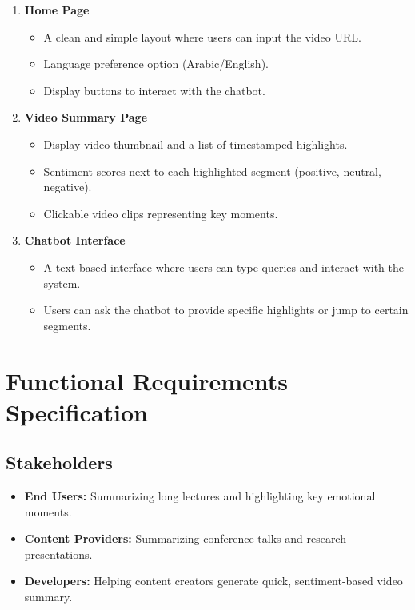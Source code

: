 \documentclass{bscs}
\begin{document}
\begin{enumerate}
    \item \textbf{Home Page}
    \begin{itemize}
        \item A clean and simple layout where users can input the video URL.
        \item Language preference option (Arabic/English).
        \item Display buttons to interact with the chatbot.
    \end{itemize}

    \item \textbf{Video Summary Page}
    \begin{itemize}
        \item Display video thumbnail and a list of timestamped highlights.
        \item Sentiment scores next to each highlighted segment (positive, neutral, negative).
        \item Clickable video clips representing key moments.
    \end{itemize}

    \item \textbf{Chatbot Interface}
    \begin{itemize}
        \item A text-based interface where users can type queries and interact with the system.
        \item Users can ask the chatbot to provide specific highlights or jump to certain segments.
    \end{itemize}

    \end{enumerate}

\newpage

\chapter{Functional Requirements Specification}

\section{Stakeholders}

\begin{itemize}
    \item \textbf{End Users:} Summarizing long lectures and highlighting key emotional moments.
    
    \item \textbf{Content Providers:} Summarizing conference talks and research presentations.

    \item \textbf{Developers:} Helping content creators generate quick, sentiment-based video summary.
    
\end{itemize}
\end{document}
